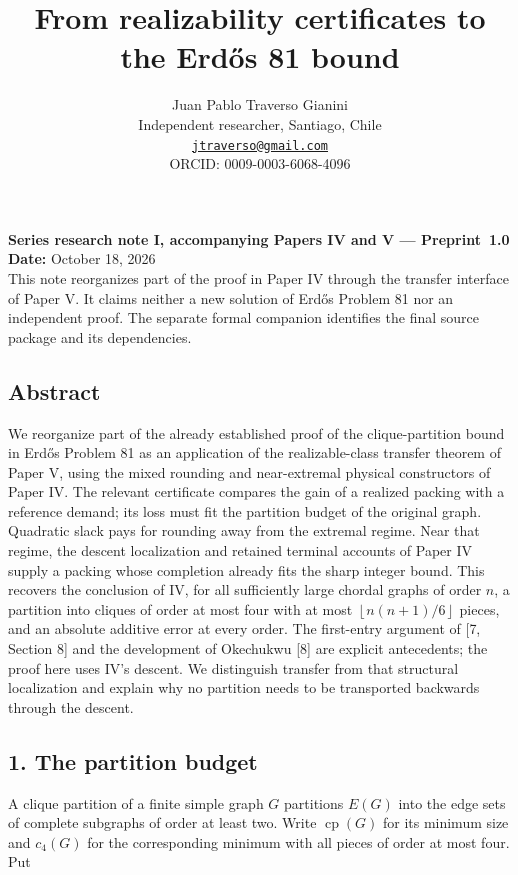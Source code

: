 \documentclass[english,11pt,a4paper]{article}
\title{From realizability certificates to the Erdős 81 bound}
\author{Juan Pablo Traverso Gianini\\
Independent researcher, Santiago, Chile\\
\href{mailto:jtraverso@gmail.com}{\nolinkurl{jtraverso@gmail.com}}\\
ORCID: 0009-0003-6068-4096}
\date{}
\begin{document}
\raggedbottom\maketitle
\textbf{Series research note I, accompanying Papers IV and V ---
\mbox{Preprint 1.0}}\\
\textbf{Date:} October 18, 2026\\
This note reorganizes part of the proof in Paper IV through the transfer
interface of Paper V. It claims neither a new solution of Erdős Problem
81 nor an independent proof. The separate formal companion identifies
the final source package and its dependencies.

\subsection{Abstract}\label{abstract}

We reorganize part of the already established proof of the
clique-partition bound in Erdős Problem 81 as an application of the
realizable-class transfer theorem of Paper V, using the mixed rounding
and near-extremal physical constructors of Paper IV. The relevant
certificate compares the gain of a realized packing with a reference
demand; its loss must fit the partition budget of the original graph.
Quadratic slack pays for rounding away from the extremal regime. Near
that regime, the descent localization and retained terminal accounts of
Paper IV supply a packing whose completion already fits the sharp
integer bound. This recovers the conclusion of IV, for all sufficiently
large chordal graphs of order \(n\), a partition into cliques of order
at most four with at most \(\left\lfloor n(n+1)/6\right\rfloor\) pieces,
and an absolute additive error at every order. The first-entry argument
of {[}7, Section 8{]} and the development of Okechukwu {[}8{]} are
explicit antecedents; the proof here uses IV's descent. We distinguish
transfer from that structural localization and explain why no partition
needs to be transported backwards through the descent.

\subsection{1. The partition budget}\label{the-partition-budget}

A clique partition of a finite simple graph \(G\) partitions \(E(G)\)
into the edge sets of complete subgraphs of order at least two. Write
\(\operatorname{cp}(G)\) for its minimum size and \(c_4(G)\) for the
corresponding minimum with all pieces of order at most four. Put
\end{document}
